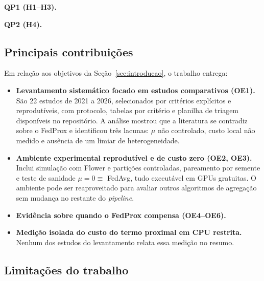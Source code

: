 \textbf{QP1 (H1--H3).} 

\textbf{QP2 (H4).} 

\subsection{Principais contribuições}

Em relação aos objetivos da Seção~\ref{sec:introducao}, o trabalho entrega:

\begin{itemize}[leftmargin=*, itemsep=2pt]
    \item \textbf{Levantamento sistemático focado em estudos comparativos (OE1).} São 22 estudos de 2021 a 2026, selecionados por critérios explícitos e reprodutíveis, com protocolo, tabelas por critério e planilha de triagem disponíveis no repositório. A análise mostrou que a literatura se contradiz sobre o FedProx e identificou três lacunas: $\mu$ não controlado, custo local não medido e ausência de um limiar de heterogeneidade.
    \item \textbf{Ambiente experimental reprodutível e de custo zero (OE2, OE3).} Inclui simulação com Flower e partições controladas, pareamento por semente e teste de sanidade $\mu = 0 \equiv$ FedAvg, tudo executável em GPUs gratuitas. O ambiente pode ser reaproveitado para avaliar outros algoritmos de agregação sem mudança no restante do \textit{pipeline}.
    \item \textbf{Evidência sobre quando o FedProx compensa (OE4--OE6).} 
    \item \textbf{Medição isolada do custo do termo proximal em CPU restrita.}  Nenhum dos estudos do levantamento relata essa medição no resumo.
\end{itemize}

\subsection{Limitações do trabalho}

